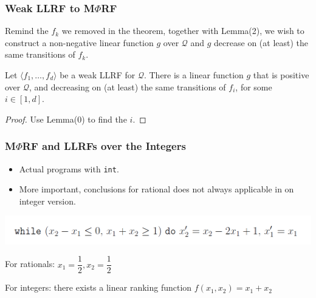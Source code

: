 \documentclass[11pt]{beamer}
\begin{document}
\begin{frame}\frametitle{Weak LLRF to M$\Phi$RF}
Remind the $f_k$ we removed in the theorem, together with Lemma(2), we wish to construct a non-negative linear function $g$ over $\mathcal{Q}$ and $g$ decrease on (at least) the same transitions of $f_k$.
\begin{lemma}[3]
Let $\langle f_1, \ldots, f_d\rangle$ be a weak LLRF for $\mathcal{Q}$. There is a linear function $g$ that is positive over $\mathcal{Q}$, and decreasing on (at least) the same transitions of $f_i$, for some $i\in [1,d]$.

\end{lemma}

\begin{proof}
Use Lemma(0) to find the $i$.
\end{proof}

\end{frame}
\begin{frame}\frametitle{M$\Phi$RF and LLRFs over the Integers}


\begin{itemize}
\item Actual programs with \texttt{int}.

\item More important, conclusions for rational does not always applicable in on integer version.

\end{itemize}
\begin{example}
\begin{center}

\includegraphics[scale = .3]{7.PNG}

\end{center}
\end{example}
For rationals: $x_1 = \dfrac{1}{2}, x_2 = \dfrac{1}{2}$

For integers: there exists a linear ranking function $f(x_1, x_2) = x_1 + x_2$
\end{frame}
\end{document}
